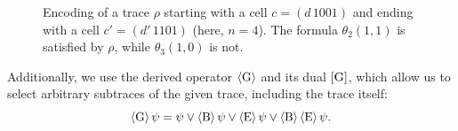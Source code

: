 \begin{figure}[t]
    \centering
    \caption{Encoding of a trace $\rho$ starting with a cell $c=(d\, 1001)$ and ending with a cell $c'=(d'\, 1101)$ (here, $n=4$). The formula $\theta_2(1,1)$ is satisfied by $\rho$, while $\theta_3(1,0)$ is not.}
    \label{fig:thetaj}
\end{figure}

Additionally, we use the derived operator $\operatorname{\langle G\rangle}$ and its dual $\operatorname{\mathopen[ G \mathclose]}$, which allow us to select  arbitrary subtraces of the given trace, including the trace itself:
\[
\operatorname{\langle G\rangle}\psi= \psi \vee \operatorname{\langle B\rangle}\psi \vee \operatorname{\langle E\rangle}\psi \vee \operatorname{\langle B\rangle}\operatorname{\langle E\rangle}\psi.
\]


